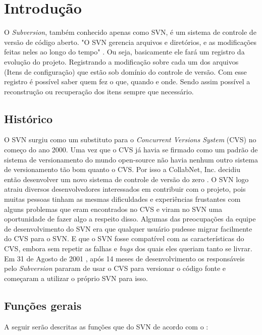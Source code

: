 \chapter[Introdução]{Introdução}

  O \textit{Subversion}, também conhecido apenas como SVN, é um sistema de controle de versão de código aberto. "O SVN gerencia arquivos e diretórios, e as modificações feitas neles ao longo do tempo" \cite{svn-book}.
  Ou seja, basicamente ele fará um registro da evolução do projeto. Registrando a modificação sobre cada um dos arquivos (Itens de configuração) que estão sob domínio do controle de versão. Com esse registro é possível saber quem fez o que, quando e onde. Sendo assim possível a reconstrução ou recuperação dos itens sempre que necessário.

\section{Histórico}

  O SVN surgiu como um substituto para o \textit{Concurrent Versions System} (CVS) \cite{cvs-book} no começo do ano 2000. Uma vez que o CVS já havia se firmado como um padrão de sistema de versionamento do mundo open-source não havia nenhum outro sistema de versionamento tão bom quanto o CVS. Por isso a CollabNet, Inc. decidiu então desenvolver um novo sistema de controle de versão do zero \cite{svn-book}.
  O SVN logo atraiu diversos desenvolvedores interessados em contribuir com o projeto, pois muitas pessoas tinham as mesmas dificuldades e experiências frustantes com alguns problemas que eram encontrados no CVS e viram no SVN uma oportunidade de fazer algo a respeito disso.
  Algumas das preocupações da equipe de desenvolvimento do SVN era que qualquer usuário pudesse migrar facilmente do CVS para o SVN. E que o SVN fosse compatível com as características do CVS, embora sem repetir as falhas e \textit{bugs} dos quais eles queriam tanto se livrar.
  Em 31 de Agosto de 2001 \cite{svn-book}, após 14 meses de desenvolvimento os responsáveis pelo \textit{Subversion} pararam de usar o CVS para versionar o código fonte e começaram a utilizar o próprio SVN para isso.

\section{Funções gerais}

  A seguir serão descritas as funções que do SVN de acordo com o :


